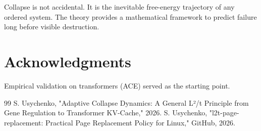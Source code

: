 \documentclass[11pt,a4paper]{article}
\begin{document}
Collapse is not accidental. It is the inevitable free-energy trajectory of any ordered system. The theory provides a mathematical framework to predict failure long before visible destruction.

\section*{Acknowledgments}
Empirical validation on transformers (ACE) served as the starting point.

\begin{thebibliography}{99}
 S. Usychenko, "Adaptive Collapse Dynamics: A General L²/t Principle from Gene Regulation to Transformer KV-Cache," 2026.
 S. Usychenko, "l2t-page-replacement: Practical Page Replacement Policy for Linux," GitHub, 2026.
\end{thebibliography}
\end{document}
